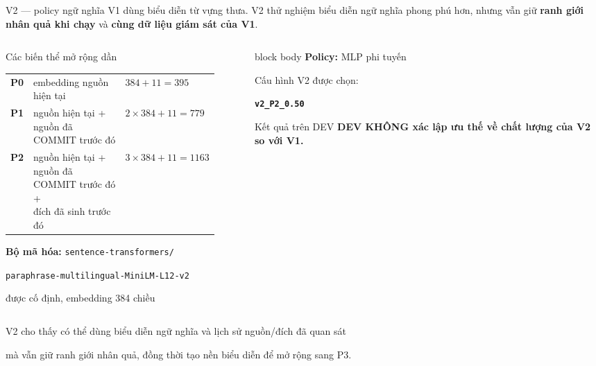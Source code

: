 \documentclass[aspectratio=169,11pt]{beamer}
\begin{document}
\begin{frame}{V2 --- policy ngữ nghĩa}
  \small
  V1 dùng biểu diễn từ vựng thưa. V2 thử nghiệm biểu diễn ngữ nghĩa phong phú hơn, nhưng vẫn giữ \textbf{ranh giới nhân quả khi chạy} và \textbf{cùng dữ liệu giám sát của V1}.
  \vspace{0.35em}
  \begin{columns}[T,onlytextwidth]
    \begin{column}{0.54\textwidth}
      \begin{block}{Các biến thể mở rộng dần}
        \scriptsize
        \begin{tabular}{@{}>{\bfseries}p{0.07\linewidth}p{0.58\linewidth}>{\raggedleft\arraybackslash}p{0.24\linewidth}@{}}
          P0 & embedding nguồn hiện tại & $384+11=395$ \\
          \addlinespace[0.25em]
          P1 & \shortstack[l]{nguồn hiện tại +\\nguồn đã COMMIT trước đó} & $2\times384+11=779$ \\
          \addlinespace[0.25em]
          P2 & \shortstack[l]{nguồn hiện tại +\\nguồn đã COMMIT trước đó +\\đích đã sinh trước đó} & $3\times384+11=1163$
        \end{tabular}
      \end{block}
      \scriptsize
      \textbf{Bộ mã hóa:} \texttt{sentence-transformers/}\par
      \texttt{paraphrase-multilingual-MiniLM-L12-v2}\par
      được cố định, embedding 384 chiều
    \end{column}
    \begin{column}{0.43\textwidth}
      \begin{beamercolorbox}[rounded=true,sep=0.55em,center]{block body}
        \textbf{Policy:} MLP phi tuyến\par
        \vspace{0.4em}
        Cấu hình V2 được chọn:\par
        \textbf{\texttt{v2\_P2\_0.50}}
      \end{beamercolorbox}
      \vspace{0.45em}
      \begin{alertblock}{Kết quả trên DEV}
        \centering\bfseries DEV KHÔNG xác lập ưu thế về chất lượng của V2 so với V1.
      \end{alertblock}
    \end{column}
  \end{columns}
  \vfill
  \centering\scriptsize
  V2 cho thấy có thể dùng biểu diễn ngữ nghĩa và lịch sử nguồn/đích đã quan sát\par
  mà vẫn giữ ranh giới nhân quả, đồng thời tạo nền biểu diễn để mở rộng sang P3.
\end{frame}
\end{document}
